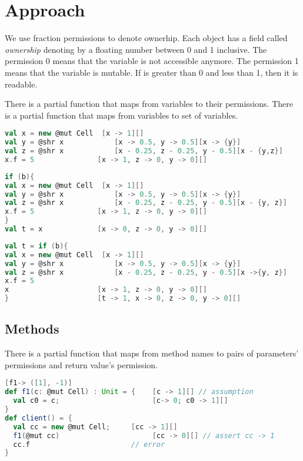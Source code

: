 \section{Approach}
We use fraction permissions to denote ownerhip. Each object has a field called \emph{ownership} denoting by a floating number between 0 and 1 inclusive. The permission 0 means that the variable is not accessible anymore. The permission 1 means that the variable is mutable. If  is greater than 0 and less than 1, then it is readable.

There is a partial function  that maps from variables to their permissions.
There is a partial function  that maps from variables to set of variables. 

\begin{lstlisting}[language=Scala,basicstyle=\footnotesize\ttfamily]
val x = new @mut Cell  [x -> 1][]
val y = @shr x            [x -> 0.5, y -> 0.5][x -> {y}] 
val z = @shr x            [x - 0.25, z - 0.25, y - 0.5][x - {y,z}]
x.f = 5               [x -> 1, z -> 0, y -> 0][]  

\end{lstlisting} 

\begin{lstlisting}[language=Scala,basicstyle=\footnotesize\ttfamily]
if (b){
val x = new @mut Cell  [x -> 1][]
val y = @shr x            [x -> 0.5, y -> 0.5][x -> {y}] 
val z = @shr x            [x - 0.25, z - 0.25, y - 0.5][x - {y, z}]
x.f = 5               [x -> 1, z -> 0, y -> 0][]  
}
val t = x             [x -> 0, z -> 0, y -> 0][]  
\end{lstlisting} 

\begin{lstlisting}[language=Scala,basicstyle=\footnotesize\ttfamily]
val t = if (b){
val x = new @mut Cell  [x -> 1][]
val y = @shr x            [x -> 0.5, y -> 0.5][x -> {y}] 
val z = @shr x            [x - 0.25, z - 0.25, y - 0.5][x ->{y, z}]
x.f = 5 
x                     [x -> 1, z -> 0, y -> 0][]  
}                     [t -> 1, x -> 0, z -> 0, y -> 0][]  
\end{lstlisting} 

\subsection{Methods}
There is a partial function  that maps from method names to pairs of parameters' permissions and return value's permission.
\begin{lstlisting}[language=Scala,basicstyle=\footnotesize\ttfamily]
[f1-> ([1], -1)] 
def f1(c: @mut Cell) : Unit = {    [c -> 1][] // assumption
  val c0 = c;                      [c-> 0; c0 -> 1][]
}    
def client() = {
  val cc = new @mut Cell;     [cc -> 1][] 
  f1(@mut cc)                      [cc -> 0][] // assert cc -> 1
  cc.f                        // error
}
\end{lstlisting}

